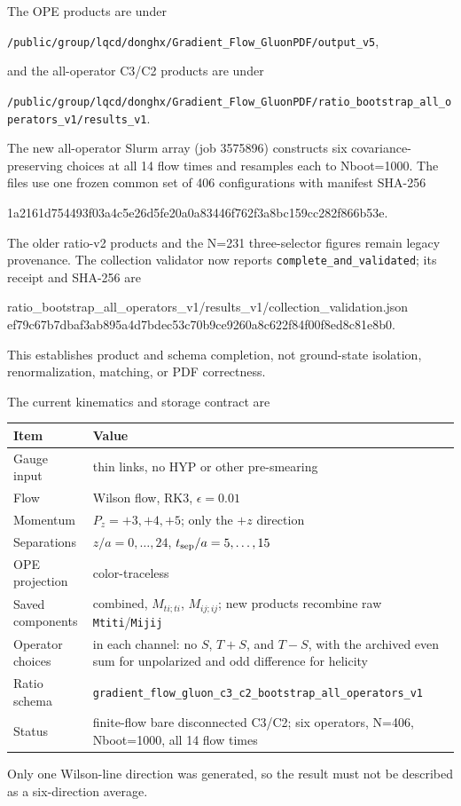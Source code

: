 \documentclass[11pt]{article}
\numberwithin{equation}{section}
\begin{document}
The OPE products are under
\begin{center}
\nolinkurl{/public/group/lqcd/donghx/Gradient_Flow_GluonPDF/output_v5},
\end{center}
and the all-operator C3/C2 products are under
\begin{center}
\nolinkurl{/public/group/lqcd/donghx/Gradient_Flow_GluonPDF/ratio_bootstrap_all_operators_v1/results_v1}.
\end{center}
The new all-operator Slurm array (job 3575896) constructs six
covariance-preserving choices at all 14 flow times and resamples each to
Nboot=1000.  The files use one frozen common set of 406 configurations with
manifest SHA-256
\begin{center}
\ttfamily\small
1a2161d754493f03a4c5e26d5fe20a0a83446f762f3a8bc159cc282f866b53e.
\end{center}
The older ratio-v2 products and the N=231 three-selector figures remain
legacy provenance.  The collection validator now reports
\texttt{complete\_and\_validated}; its receipt and SHA-256 are
\begin{center}
\ttfamily\small
ratio\_bootstrap\_all\_operators\_v1/results\_v1/collection\_validation.json\\
ef79c67b7dbaf3ab895a4d7bdec53c70b9ce9260a8c622f84f00f8ed8c81e8b0.
\end{center}
This establishes product and schema completion, not ground-state isolation,
renormalization, matching, or PDF correctness.

The current kinematics and storage contract are
\begin{center}
\begin{tabular}{>{\raggedright\arraybackslash}p{}>{\raggedright\arraybackslash}p{}}
\toprule
Item & Value\\
\midrule
Gauge input & thin links, no HYP or other pre-smearing\\
Flow & Wilson flow, RK3, \(\epsilon=0.01\)\\
Momentum & \(P_z=+3,+4,+5\); only the \(+z\) direction\\
Separations & \(z/a=0,\ldots,24\), \(t_{\rm sep}/a=5,\ldots,15\)\\
OPE projection & color-traceless\\
Saved components & combined, \(M_{ti;ti}\), \(M_{ij;ij}\); new products
recombine raw \texttt{Mtiti}/\texttt{Mijij}\\
Operator choices & in each channel: no \(S\), \(T+S\), and \(T-S\),
with the archived even sum for unpolarized and odd difference for helicity\\
Ratio schema & {\scriptsize\texttt{gradient\_flow\_gluon\_c3\_c2\_bootstrap\_all\_operators\_v1}}\\
Status & finite-flow bare disconnected C3/C2; six operators, N=406,
Nboot=1000, all 14 flow times\\
\bottomrule
\end{tabular}
\end{center}
Only one Wilson-line direction was generated, so the result must not be
described as a six-direction average.
\end{document}
